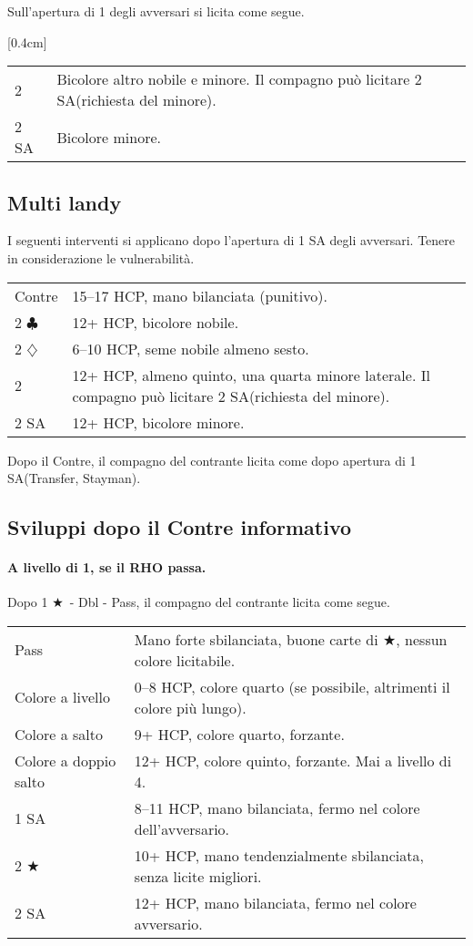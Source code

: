 \documentclass[a4paper,10pt]{article}
\renewcommand{\c}{$\clubsuit$\xspace}
\renewcommand{\d}{$\diamondsuit$\xspace}
\renewcommand{\j}{$\bigstar$\xspace}
\newcommand{\sa}{SA\xspace}
\newcommand{\M}{\raisebox{-1.2pt}{$^\heartsuit \mkern-6mu$} \raisebox{1.2pt}{$\mkern-6mu _\spadesuit$}\xspace}%
\newcommand{\smallspace}{\vskip0.3cm}
\renewcommand{\tabcolsep}{0.3cm}
\newenvironment{twocol}
  {\smallspace\noindent\begin{tabular}{l p{0.78\textwidth}}}
  {\end{tabular}\smallspace}
\newcommand{\biddingtable}[2][0.4cm]{
  \needspace{1cm}
  \marginnote{
    \scriptsize{
    \def\arraystretch{1.5}
    \renewcommand{\tabcolsep}{0.1cm}
    \begin{tabular}{|>{\centering\arraybackslash}p{0.6cm}>{\centering\arraybackslash}p{0.6cm}>{\centering\arraybackslash}p{0.6cm}>{\centering\arraybackslash}p{0.6cm}|}
      \hline
      #2
    \end{tabular}
    }
  }[#1]
}
\begin{document}
Sull'apertura di 1 \M degli avversari si licita come segue.

\biddingtable{1 \M & * &&}
\begin{twocol}
  2 \M & Bicolore altro nobile e minore. Il compagno può licitare 2 \sa (richiesta del minore).\\
  2 \sa & Bicolore minore.
\end{twocol}

\subsection{Multi landy}

I seguenti interventi si applicano dopo l'apertura di 1 \sa degli avversari. Tenere in considerazione le vulnerabilità.
\begin{twocol}
 Contre & 15--17 HCP, mano bilanciata (punitivo).\\
 2 \c & 12+ HCP, bicolore nobile.\\
 2 \d & 6--10 HCP, seme nobile almeno sesto.\\
 2 \M & 12+ HCP, \M almeno quinto, una quarta minore laterale. Il compagno può licitare 2 \sa (richiesta del minore).\\
 2 \sa & 12+ HCP, bicolore minore.\\
\end{twocol}

Dopo il Contre, il compagno del contrante licita come dopo apertura di 1 \sa (Transfer, Stayman).


\subsection{Sviluppi dopo il Contre informativo}

\paragraph{A livello di 1, se il RHO passa.} Dopo 1 \j\ - Dbl - Pass, il compagno del contrante licita come segue.

\begin{twocol}
	Pass & Mano forte sbilanciata, buone carte di \j, nessun colore licitabile. \\
	Colore a livello & 0--8 HCP, colore quarto (se possibile, altrimenti il colore più lungo). \\
	Colore a salto & 9+ HCP, colore quarto, forzante. \\
	Colore a doppio salto & 12+ HCP, colore quinto, forzante. Mai a livello di 4. \\
	1 \sa & 8--11 HCP, mano bilanciata, fermo nel colore dell'avversario. \\
	2 \j & 10+ HCP, mano tendenzialmente sbilanciata, senza licite migliori. \\
	2 \sa & 12+ HCP, mano bilanciata, fermo nel colore avversario. \\
\end{twocol}
\end{document}
